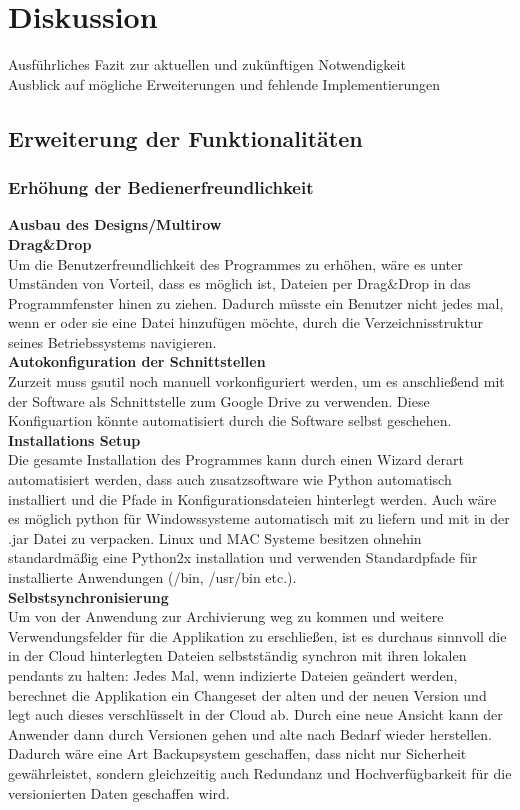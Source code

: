 \documentclass[12pt,a4paper,bibliography=totocnumbered,listof=totocnumbered]{scrartcl}
\begin{document}
\section{Diskussion}
Ausführliches Fazit zur aktuellen und zukünftigen Notwendigkeit\\
Ausblick auf mögliche Erweiterungen und fehlende Implementierungen

\subsection{Erweiterung der Funktionalitäten}
\subsubsection{Erhöhung der Bedienerfreundlichkeit}
\textbf{Ausbau des Designs/Multirow}
\\\textbf{Drag\&Drop}\\
Um die Benutzerfreundlichkeit des Programmes zu erhöhen, wäre es unter Umständen von Vorteil, dass es möglich ist, Dateien per Drag\&Drop in das Programmfenster hinen zu ziehen. Dadurch müsste ein Benutzer nicht jedes mal, wenn er oder sie eine Datei hinzufügen möchte, durch die Verzeichnisstruktur seines Betriebssystems navigieren.
\\\textbf{Autokonfiguration der Schnittstellen}\\
Zurzeit muss gsutil noch manuell vorkonfiguriert werden, um es anschließend mit der Software als Schnittstelle zum Google Drive zu verwenden. Diese Konfiguartion könnte automatisiert durch die Software selbst geschehen.
\\\textbf{Installations Setup}\\
Die gesamte Installation des Programmes kann durch einen Wizard derart automatisiert werden, dass auch zusatzsoftware wie Python automatisch installiert und die Pfade in Konfigurationsdateien hinterlegt werden. Auch wäre es möglich python für Windowssysteme automatisch mit zu liefern und mit in der .jar Datei zu verpacken. Linux und MAC Systeme besitzen ohnehin standardmäßig eine Python2x installation und verwenden Standardpfade für installierte Anwendungen (/bin, /usr/bin etc.).
\\\textbf{Selbstsynchronisierung}\\
Um von der Anwendung zur Archivierung weg zu kommen und weitere Verwendungsfelder für die Applikation zu erschließen, ist es durchaus sinnvoll die in der Cloud hinterlegten Dateien selbstständig synchron mit ihren lokalen pendants zu halten: Jedes Mal, wenn indizierte Dateien geändert werden, berechnet die Applikation ein Changeset der alten und der neuen Version und legt auch dieses verschlüsselt in der Cloud ab. Durch eine neue Ansicht kann der Anwender dann durch Versionen gehen und alte nach Bedarf wieder herstellen. Dadurch wäre eine Art Backupsystem geschaffen, dass nicht nur Sicherheit gewährleistet, sondern gleichzeitig auch Redundanz und Hochverfügbarkeit für die versionierten Daten geschaffen wird.
\end{document}
